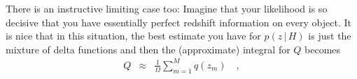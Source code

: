 \documentclass[12pt]{article}
\newcommand{\given}{\,|\,}
\begin{document}
There is an instructive limiting case too: Imagine that your
likelihood is so decisive that you have essentially perfect redshift
information on every object.  It is nice that in this situation, the
best estimate you have for $p(z \given H)$ is just the mixture of
delta functions and then the (approximate) integral for $Q$ becomes
\begin{eqnarray}\displaystyle
Q &\approx& \frac{1}{\Omega} \sum_{m=1}^M q(z_m)
\quad ,
\end{eqnarray}
\end{document}
